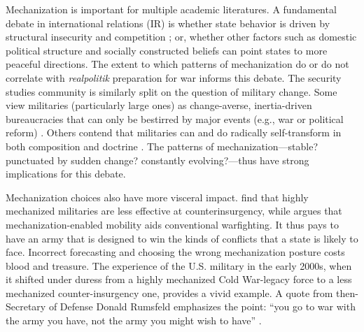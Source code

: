 \documentclass{article}
\begin{document}
Mechanization is important for multiple academic literatures. A
fundamental debate in international relations (IR) is whether state
behavior is driven by structural insecurity and 
competition \citep{waltz2001man, mearsheimer2001tragedy}; or, whether other
factors such as domestic political structure \citep{russett1994grasping} and
socially constructed beliefs \citep{wendt1992anarchy} can point states to more peaceful directions. 
The extent to which patterns of mechanization do or do not correlate with
\textit{realpolitik} preparation for war informs this debate.
The security studies community is similarly split on the question of military
change. Some view militaries (particularly large ones) as change-averse, 
inertia-driven bureaucracies that can only be bestirred by major events (e.g.,
war or political reform)
\citep{posen1986sources,zegart2000flawed,locher2004victory,halperin2007bureaucratic}. 
Others contend that militaries can and do radically self-transform in both composition and doctrine
\citep{murray1998military,adamsky2010culture}. The patterns of
mechanization---stable? punctuated by sudden change? constantly evolving?---thus
have strong implications for this debate.

Mechanization choices also have more visceral impact.
\citet{lyall2009rage} find that highly mechanized militaries are less effective
at counterinsurgency, while \citet{biddle2004military} argues that
mechanization-enabled mobility aids conventional warfighting. It thus
pays to have an army that is designed to win the kinds of conflicts that a state is 
likely to face. Incorrect forecasting and choosing the wrong mechanization
posture costs blood and treasure. The experience of the U.S. military in the early
2000s, when it shifted under duress from a highly mechanized Cold War-legacy force to a less
mechanized counter-insurgency one, provides a vivid example. A quote from then-Secretary of Defense 
Donald Rumsfeld emphasizes the point:
``you go to war with the army you have, not the army you might wish to have'' \citep{schmitt_2004}. 
\end{document}
